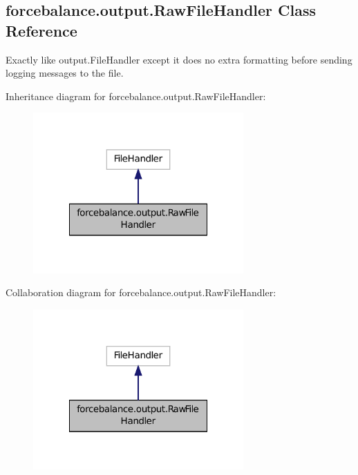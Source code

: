 \hypertarget{classforcebalance_1_1output_1_1RawFileHandler}{\subsection{forcebalance.\-output.\-Raw\-File\-Handler Class Reference}
\label{classforcebalance_1_1output_1_1RawFileHandler}
}


Exactly like output.\-File\-Handler except it does no extra formatting before sending logging messages to the file.  




Inheritance diagram for forcebalance.\-output.\-Raw\-File\-Handler\-:
\nopagebreak
\begin{figure}[H]
\begin{center}
\leavevmode
\includegraphics[width=228pt]{classforcebalance_1_1output_1_1RawFileHandler__inherit__graph}
\end{center}
\end{figure}


Collaboration diagram for forcebalance.\-output.\-Raw\-File\-Handler\-:
\nopagebreak
\begin{figure}[H]
\begin{center}
\leavevmode
\includegraphics[width=228pt]{classforcebalance_1_1output_1_1RawFileHandler__coll__graph}
\end{center}
\end{figure}
